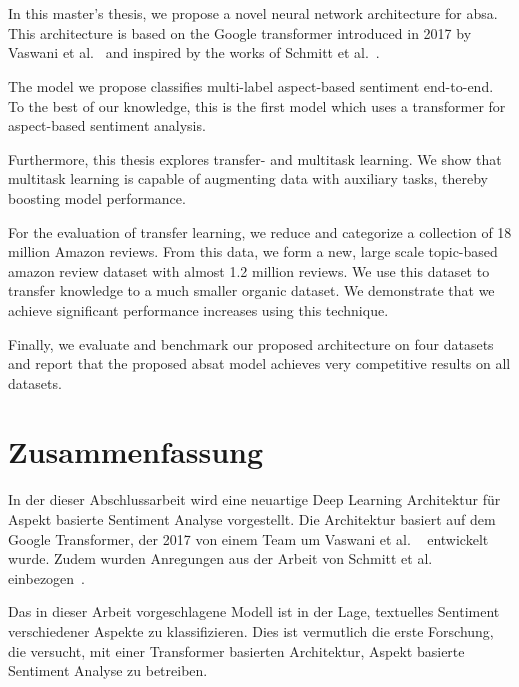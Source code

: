 \chapter{\abstractname}

In this master's thesis, we propose a novel neural network architecture for \acrfull{absa}. This architecture is based on the Google transformer introduced in 2017 by Vaswani et al.~\cite{Vaswani2017} and inspired by the works of Schmitt et al.~\cite{Schmitt2018}.
\medskip

The model we propose classifies multi-label aspect-based sentiment end-to-end. To the best of our knowledge, this is the first model which uses a transformer for aspect-based sentiment analysis.
\medskip

Furthermore, this thesis explores transfer- and multitask learning. We show that multitask learning is capable of augmenting data with auxiliary tasks, thereby boosting model performance. 
\medskip

For the evaluation of transfer learning, we reduce and categorize a collection of 18 million Amazon reviews. From this data, we form a new, large scale topic-based amazon review dataset with almost 1.2 million reviews. We use this dataset to transfer knowledge to a much smaller organic dataset. We demonstrate that we achieve significant performance increases using this technique.
\medskip

Finally, we evaluate and benchmark our proposed architecture on four datasets and report that the proposed \acrfull{absat} model achieves very competitive results on all datasets.


\chapter{Zusammenfassung}

In der dieser Abschlussarbeit wird eine neuartige Deep Learning Architektur für Aspekt basierte Sentiment Analyse vorgestellt. Die Architektur basiert auf dem Google Transformer, der 2017 von einem Team um Vaswani et al. ~\cite{Vaswani2017} entwickelt wurde. Zudem wurden Anregungen aus der Arbeit von Schmitt et al. einbezogen~\cite{Schmitt2018}.
\medskip

Das in dieser Arbeit vorgeschlagene Modell ist in der Lage, textuelles Sentiment verschiedener Aspekte zu klassifizieren. Dies ist vermutlich die erste Forschung, die versucht, mit einer Transformer basierten Architektur, Aspekt basierte Sentiment Analyse zu betreiben.

